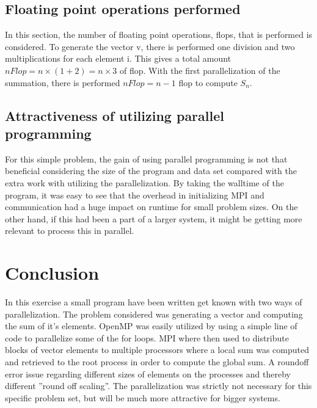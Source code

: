 \documentclass[12p]{article}
\begin{document}
\subsection{Floating point operations performed}
In this section, the number of floating point operations, flops, that is performed is considered. To generate the vector v, there is performed one division and two multiplications for each element i. This gives a total amount $nFlop = n × (1 + 2) = n × 3$ of flop. With the first parallelization of the summation, there is performed $nF lop = n − 1$ flop to compute $S_n$. 

\subsection{Attractiveness of utilizing parallel programming}
For this simple problem, the gain of using parallel programming is not that beneficial considering the size of the program and data set compared with the extra work with utilizing the parallelization. By taking the walltime of the program, it was easy to see that the overhead in initializing MPI and communication had a huge impact on runtime for small problem sizes. On the other hand, if this had been a part of a larger system, it might be getting more relevant to process this in parallel.

\section{Conclusion}
In this exercise a small program have been written get known with two ways of parallelization. The problem considered was generating a vector and computing the sum of it's elements. OpenMP was easily utilized by using a simple line of code to parallelize some of the for loops. MPI where then used to distribute blocks of vector elements to multiple processors where a local sum was computed and retrieved to the root process in order to compute the global sum. A roundoff error issue regarding different sizes of elements on the processes and thereby different ”round off scaling”. The parallelization was strictly not necessary for this specific problem set, but will be much more attractive for bigger systems.



\end{document}
